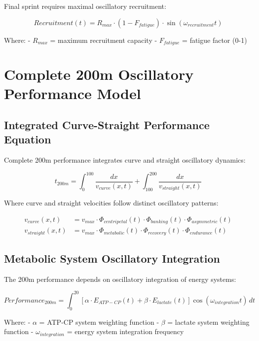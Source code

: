 \documentclass[12pt]{article}
\begin{document}
Final sprint requires maximal oscillatory recruitment:

\begin{equation}
Recruitment(t) = R_{max} \cdot \left(1 - F_{fatigue}\right) \cdot \sin(\omega_{recruitment}t)
\end{equation}

Where:
- $R_{max}$ = maximum recruitment capacity
- $F_{fatigue}$ = fatigue factor (0-1)

\section{Complete 200m Oscillatory Performance Model}

\subsection{Integrated Curve-Straight Performance Equation}

Complete 200m performance integrates curve and straight oscillatory dynamics:

\begin{equation}
t_{200m} = \int_0^{100} \frac{dx}{v_{curve}(x,t)} + \int_{100}^{200} \frac{dx}{v_{straight}(x,t)}
\end{equation}

Where curve and straight velocities follow distinct oscillatory patterns:

\begin{align}
v_{curve}(x,t) &= v_{max} \cdot \Phi_{centripetal}(t) \cdot \Phi_{banking}(t) \cdot \Phi_{asymmetric}(t) \\
v_{straight}(x,t) &= v_{max} \cdot \Phi_{metabolic}(t) \cdot \Phi_{recovery}(t) \cdot \Phi_{endurance}(t)
\end{align}

\subsection{Metabolic System Oscillatory Integration}

The 200m performance depends on oscillatory integration of energy systems:

\begin{equation}
Performance_{200m} = \int_0^{20} \left[\alpha \cdot E_{ATP-CP}(t) + \beta \cdot E_{lactate}(t)\right] \cos(\omega_{integration}t) \, dt
\end{equation}

Where:
- $\alpha$ = ATP-CP system weighting function
- $\beta$ = lactate system weighting function  
- $\omega_{integration}$ = energy system integration frequency
\end{document}
